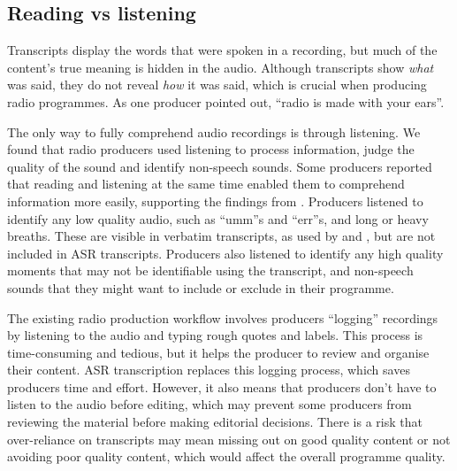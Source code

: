 
\subsection{Reading vs listening}

Transcripts display the words that were spoken in a recording, but much of the content's true meaning is hidden in the
audio. Although transcripts show \textit{what} was said, they do not reveal \textit{how} it was said, which is crucial
when producing radio programmes.  As one producer pointed out, ``radio is made with your ears''.

The only way to fully comprehend audio recordings is through listening.  We found that radio producers used listening
to process information, judge the quality of the sound and identify non-speech sounds.  Some producers reported that
reading and listening at the same time enabled them to comprehend information more easily, supporting the findings from
\citet{Vemuri2004}.  Producers listened to identify any low quality audio, such as ``umm''s and ``err''s, and long or heavy
breaths. These are visible in verbatim transcripts, as used by \citet{Berthouzoz2012} and \citet{Rubin2013}, but are
not included in ASR transcripts.  Producers also listened to identify any high quality moments that may not be
identifiable using the transcript, and non-speech sounds that they might want to include or exclude in their programme.


The existing radio production workflow involves producers ``logging'' recordings by listening to the audio and typing
rough quotes and labels.  This process is time-consuming and tedious, but it helps the producer to review and organise
their content.  ASR transcription replaces this logging process, which saves producers time and effort. However, it
also means that producers don't have to listen to the audio before editing, which may prevent some producers from
reviewing the material before making editorial decisions.  There is a risk that over-reliance on transcripts may mean
missing out on good quality content or not avoiding poor quality content, which would affect the overall programme
quality.


